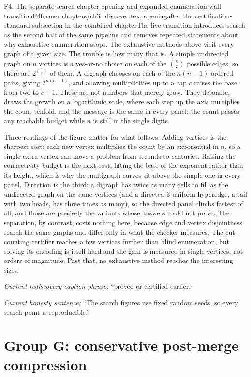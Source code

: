 \begin{offcutrewrite}{F4. The separate search-chapter opening and expanded enumeration-wall transition}{F4}{former chapters/ch3\_discover.tex, opening}{after the certification-standard subsection in the combined chapter}{The live transition introduces search as the second half of the same pipeline and removes repeated statements about why exhaustive enumeration stops.}
The exhaustive methods above visit every graph of a given size. The trouble is how many that is. A simple undirected graph on $n$ vertices is a yes-or-no choice on each of the $\binom{n}{2}$ possible edges, so there are $2^{\binom{n}{2}}$ of them. A digraph chooses on each of the $n(n-1)$ ordered pairs, giving $2^{n(n-1)}$, and allowing multiplicities up to a cap $c$ raises the base from two to $c + 1$. These are not numbers that merely grow. They detonate.  draws the growth on a logarithmic scale, where each step up the axis multiplies the count tenfold, and the message is the same in every panel: the count passes any reachable budget while $n$ is still in the single digits.

Three readings of the figure matter for what follows. Adding vertices is the sharpest cost: each new vertex multiplies the count by an exponential in $n$, so a single extra vertex can move a problem from seconds to centuries. Raising the connectivity budget is the next cost, lifting the base of the exponent rather than its height, which is why the multigraph curves sit above the simple one in every panel. Direction is the third: a digraph has twice as many cells to fill as the undirected graph on the same vertices (and a directed $3$-uniform hyperedge, a tail with two heads, has three times as many), so the directed panel climbs fastest of all, and those are precisely the variants whose answers  could not prove. The separation, by contrast, costs nothing here, because edge and vertex disjointness search the same graphs and differ only in what the checker measures. The cut-counting certifier reaches a few vertices further than blind enumeration, but solving its encoding is itself hard and the gain is measured in single vertices, not orders of magnitude. Past that, no exhaustive method reaches the interesting sizes.

\noindent\emph{Current rediscovery-caption phrase:} ``proved or certified earlier.''

\noindent\emph{Current honesty sentence:} ``The search figures use fixed random seeds, so every search point is reproducible.''
\end{offcutrewrite}

\section*{Group G: conservative post-merge compression}

